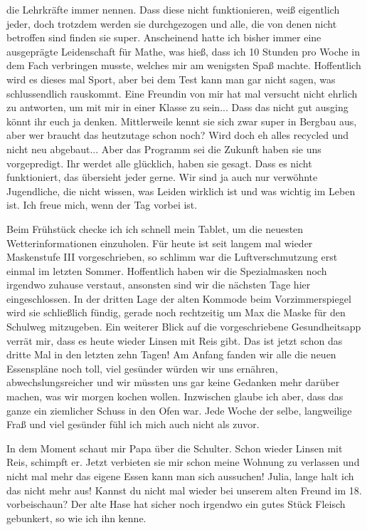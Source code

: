 \documentclass[twoside, a4paper, DIV=11, open=any, bibliography=totoc]{scrbook}
\begin{document}
die Lehrkräfte immer nennen.
Dass diese nicht funktionieren, weiß eigentlich jeder, doch trotzdem werden sie
durchgezogen und alle, die
von denen nicht betroffen sind finden sie super. Anscheinend hatte ich bisher immer
eine ausgeprägte Leidenschaft für Mathe, was hieß, dass ich 10 Stunden pro Woche in
dem Fach verbringen musste,
welches mir am wenigsten Spaß machte. Hoffentlich wird es dieses mal Sport, aber
bei dem Test kann man gar nicht
sagen, was schlussendlich rauskommt. Eine Freundin von mir hat mal versucht nicht
ehrlich zu antworten, um
mit mir in einer Klasse zu sein... Dass das nicht gut ausging könnt ihr euch ja
denken. Mittlerweile kennt
sie sich zwar super in Bergbau aus, aber wer braucht das heutzutage schon noch?
Wird doch eh alles recycled und
nicht neu abgebaut... Aber das Programm sei die Zukunft haben sie uns vorgepredigt.
Ihr werdet alle glücklich,
haben sie gesagt. Dass es nicht funktioniert, das übersieht jeder gerne. Wir sind
ja auch nur verwöhnte
Jugendliche, die nicht wissen, was Leiden wirklich ist und was wichtig im Leben
ist.
Ich freue mich, wenn der Tag vorbei ist.


Beim Frühstück checke ich ich schnell mein Tablet, um die neuesten Wetterinformationen
einzuholen. Für heute ist seit langem mal wieder Maskenstufe III vorgeschrieben, 
so schlimm war die Luftverschmutzung erst einmal im letzten Sommer.
Hoffentlich haben wir die Spezialmasken noch irgendwo zuhause verstaut,
ansonsten sind wir die nächsten Tage hier eingeschlossen. In der dritten Lage
der alten Kommode beim Vorzimmerspiegel wird sie schließlich fündig, gerade noch
rechtzeitig um Max die Maske für den Schulweg mitzugeben.
Ein weiterer Blick auf die vorgeschriebene Gesundheitsapp verrät mir, dass
es heute wieder Linsen mit Reis gibt. Das ist jetzt schon das dritte Mal in den
letzten zehn Tagen! Am Anfang fanden wir alle die neuen Essenspläne noch toll,
viel gesünder würden wir uns ernähren, abwechslungsreicher und wir müssten uns
gar keine Gedanken mehr darüber machen, was wir morgen kochen wollen.
Inzwischen glaube ich aber, dass das ganze ein ziemlicher Schuss in den Ofen war.
Jede Woche der selbe, langweilige Fraß und viel gesünder 
fühl ich mich auch nicht als zuvor.

In dem Moment schaut mir Papa über die Schulter.
Schon wieder Linsen mit Reis, schimpft er. Jetzt verbieten sie mir schon meine
Wohnung zu verlassen und nicht mal mehr das eigene Essen kann man sich aussuchen!
Julia, lange halt ich das nicht mehr aus! Kannst du nicht mal wieder bei unserem
alten Freund im 18. vorbeischaun? Der alte Hase hat sicher noch irgendwo ein
gutes Stück Fleisch gebunkert, so wie ich ihn kenne.
\end{document}
